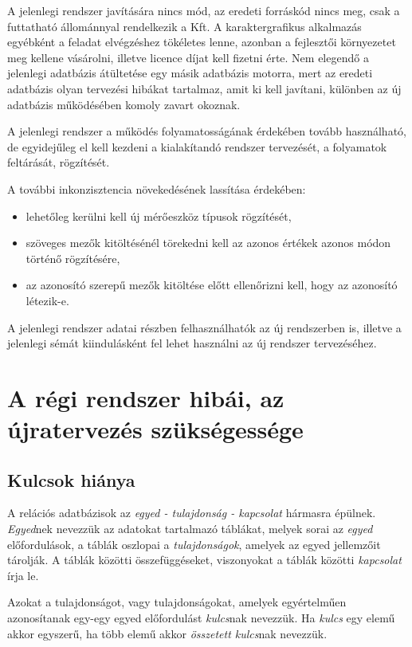 \documentclass[a4paper,12pt]{report}
\begin{document}
A jelenlegi rendszer javítására nincs mód, az eredeti forráskód nincs meg, csak
a futtatható állománnyal rendelkezik a Kft. 
A karaktergrafikus alkalmazás egyébként a feladat elvégzéshez tökéletes lenne, 
azonban a fejlesztői környezetet meg kellene vásárolni, illetve licence díjat 
kell fizetni érte.
Nem elegendő a jelenlegi adatbázis átültetése egy másik adatbázis motorra, mert
az eredeti adatbázis olyan tervezési hibákat tartalmaz, amit ki kell javítani, 
különben az új adatbázis működésében komoly zavart okoznak.

A jelenlegi rendszer a működés folyamatosságának érdekében tovább használható, 
de egyidejűleg el kell kezdeni a kialakítandó rendszer tervezését, a folyamatok 
feltárását, rögzítését.

A további inkonzisztencia növekedésének lassítása érdekében:
\begin{itemize}
\item lehetőleg kerülni kell új mérőeszköz típusok rögzítését,
\item  szöveges mezők kitöltésénél törekedni kell az azonos értékek azonos módon
történő rögzítésére,
\item az azonosító szerepű mezők kitöltése előtt ellenőrizni kell, hogy az 
azonosító létezik-e.
\end{itemize}

A jelenlegi rendszer adatai részben felhasználhatók az új rendszerben is, 
illetve a jelenlegi sémát kiindulásként fel lehet használni az új rendszer 
tervezéséhez.

\section{A régi rendszer hibái, az újratervezés szükségessége}

\subsection{Kulcsok hiánya}
A relációs adatbázisok az \textit{egyed - tulajdonság - kapcsolat} hármasra
épülnek. \textit{Egyed}nek nevezzük az adatokat tartalmazó táblákat, melyek 
sorai az \textit{egyed} előfordulások, a táblák oszlopai a 
\textit{tulajdonságok}, amelyek az egyed jellemzőit tárolják. A táblák 
közötti összefüggéseket, viszonyokat a táblák közötti \textit{kapcsolat} írja 
le.

Azokat a tulajdonságot, vagy tulajdonságokat, amelyek egyértelműen azonosítanak
egy-egy egyed előfordulást \textit{kulcs}nak nevezzük. Ha \textit{kulcs} egy 
elemű akkor egyszerű, ha több elemű akkor \textit{összetett kulcs}nak nevezzük.
\end{document}
